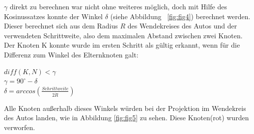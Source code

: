  $\gamma$ direkt zu berechnen war nicht ohne weiteres möglich, doch mit Hilfe des Kosinussatzes konnte der Winkel $\delta$ (siehe Abbildung ~\ref{fig:fig4}) berechnet werden. Dieser berechnet sich aus dem Radius $R$ des Wendekreises des Autos und der verwendeten Schrittweite, also dem maximalen Abstand zwischen zwei Knoten. \\
Der Knoten K konnte wurde im ersten Schritt als gültig erkannt, wenn für die Differenz zum Winkel des Elternknoten galt: 
\begin{center}
$diff(K,N) <\gamma$ \\
$\gamma = 90^{\circ} - \delta$  \\
$\delta = arccos (\frac{Schrittweite}{2 \dot R})$  \\
\end{center}

Alle Knoten außerhalb dieses Winkels würden bei der Projektion im Wendekreis des Autos landen, wie in Abbildung \ref{fig:fig5} zu sehen. Diese Knoten(rot) wurden verworfen.\\
